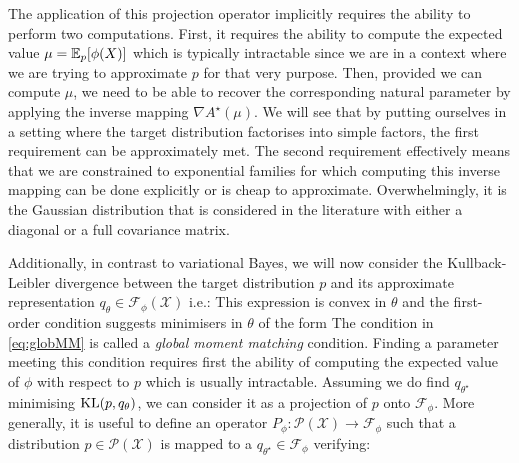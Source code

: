 The application of this projection operator implicitly requires the ability to perform two computations. First, it requires the ability to compute the expected value $\mu=\mathbb E_{p}[\phi(X)]$ which is typically intractable since we are in a context where we are trying to approximate $p$ for that very purpose. Then, provided we can compute $\mu$, we need to be able to recover the corresponding natural parameter by applying the inverse mapping $\nabla A^{\star}(\mu)$. We will see that by putting ourselves in a setting where the target distribution factorises into simple factors, the first requirement can be approximately met. The second requirement effectively means that we are constrained to exponential families for which computing this inverse mapping can be done explicitly or is cheap to approximate. Overwhelmingly, it is the Gaussian distribution that is considered in the literature with either a diagonal or a full covariance matrix. 



\vspace*{2cm}
Additionally, in contrast to variational Bayes, we will now consider the Kullback-Leibler divergence between the target distribution $p$ and its approximate representation $q_{\theta}\in\mathcal F_{\phi}(\mathcal X)$ i.e.:
%
%
This expression is convex in $\theta$ and the first-order condition suggests minimisers in $\theta$ of the form
%
%
The condition in \eqref{eq:globMM} is called a \emph{global moment matching} condition. 
Finding a parameter meeting this condition requires first the ability of computing the expected value of $\phi$ with respect to $p$ which is usually intractable.
Assuming we do find $q_{\theta^{\star}}$ minimising $\mathrm{KL}\!\left(p,q_{\theta}\right)$, we can consider it as a projection of $p$ onto $\mathcal F_{\phi}$. More generally, it is useful to define an operator $P_{\phi}:\mathcal P(\mathcal X)\to\mathcal F_{\phi}$ such that a distribution $p\in\mathcal P(\mathcal X)$ is mapped to a $q_{\theta^{\star}}\in\mathcal F_{\phi}$ verifying:
%
%

